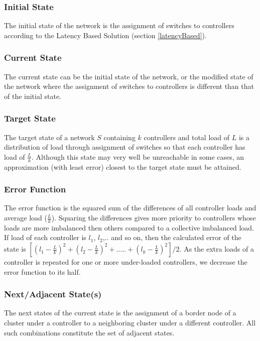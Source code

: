 \documentclass{article}
\begin{document}
	\subsubsection{Initial State}
	The initial state of the network is the assignment of switches to controllers according to the Latency Based Solution (section \ref{latencyBased}).
	
	\subsubsection{Current State}
	The current state can be the initial state of the network, or the modified state of the network where the assignment of switches to controllers is different than that of the initial state.
	
	\subsubsection{Target State}
	The target state of a network $S$ containing $k$ controllers and total load of $L$ is a distribution of load through assignment of switches so that each controller has load of $\frac{L}{k}$. Although this state may very well be unreachable in some cases, an approximation (with least error) closest to the target state must be attained.
	
	\subsubsection{Error Function}
	The error function is the squared sum of the differences of all controller loads and average load ($\frac{L}{k}$). Squaring the differences gives more priority to controllers whose loads are more imbalanced then others compared to a collective imbalanced load. If load of each controller is $l_1$, $l_2$,.. and so on, then the calculated error of the state is $[(l_1-\frac{L}{k})^2 + (l_2-\frac{L}{k})^2 + ..... + (l_k-\frac{L}{k})^2]/2$. As the extra loads of a controller is repeated for one or more under-loaded controllers, we decrease the error function to its half.
	
	\subsubsection{Next/Adjacent State(s)}
	The next states of the current state is the assignment of a border node of a cluster under a controller to a neighboring cluster under a different controller. All such combinations constitute the set of adjacent states.
	
\end{document}
